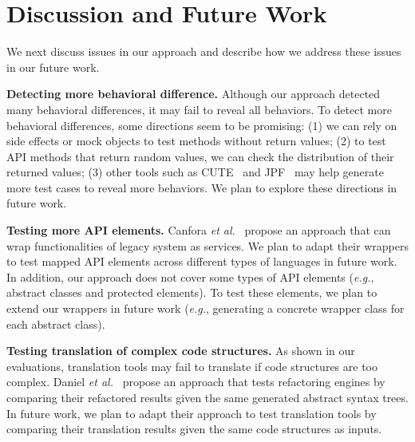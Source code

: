 

\section{Discussion and Future Work}
\label{sec:discuss}

We next discuss issues in our approach and describe how we address
these issues in our future work.

\textbf{Detecting more behavioral difference.} Although our approach detected many behavioral differences, it may fail to reveal all behaviors. To detect more behavioral differences, some directions seem to be promising: (1) we can rely on side effects or  mock objects to test methods without return values; (2) to test API methods that return random values, we can check the distribution of their returned values; (3) other tools such as CUTE~\cite{koushik:cute} and JPF~\cite{visser2003mcp} may help generate more test cases to reveal more behaviors. We plan to explore these directions in future work.

\textbf{Testing more API elements.} Canfora \emph{et al.}~\cite{CanforaFFT08} propose an approach that can wrap functionalities of legacy system as services. We plan to adapt their wrappers to test mapped API elements across different types of languages in future work. In addition, our approach does not cover some types of API elements (\emph{e.g.}, abstract classes and protected elements). To test these elements, we plan to extend our wrappers in future work (\emph{e.g.}, generating a concrete wrapper class for each abstract class).

\textbf{Testing translation of complex code structures.} As shown in our evaluations, translation tools may fail to translate if code structures are too complex. Daniel \emph{et al.}~\cite{daniel2007automated} propose an approach that tests refactoring engines by comparing their refactored results given the same generated abstract syntax trees. In future work, we plan to adapt their approach to test translation tools by comparing their translation results given the same code structures as inputs.

